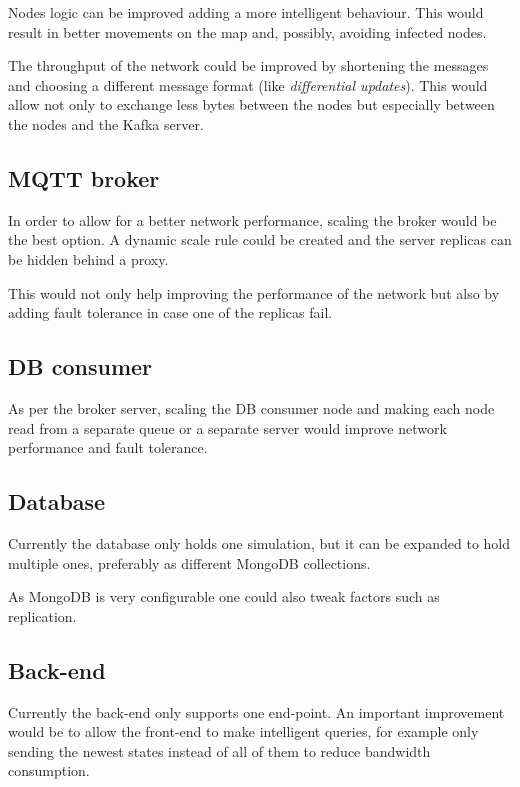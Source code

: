 \documentclass[conference]{IEEEtran}
\begin{document}
		Nodes logic can be improved adding a more intelligent behaviour.
		This would result in better movements on the map and, possibly, avoiding infected nodes.
		
		The throughput of the network could be improved by shortening the messages and choosing a different message format (like \textit{differential updates}).
		This would allow not only to exchange less bytes between the nodes but especially between the nodes and the Kafka server.
	
	\subsection{MQTT broker}
		
		In order to allow for a better network performance, scaling the broker would be the best option.
		A dynamic scale rule could be created and the server replicas can be hidden behind a proxy.
		
		This would not only help improving the performance of the network but also by adding fault tolerance in case one of the replicas fail.
		
	\subsection{DB consumer}
		
		As per the broker server, scaling the DB consumer node and making each node read from a separate queue or a separate server would improve network performance and fault tolerance.
	
	\subsection{Database}
	
		Currently the database only holds one simulation, but it can be expanded to hold multiple ones, preferably as different MongoDB collections.
		
		As MongoDB is very configurable one could also tweak factors such as replication.
	
	\subsection{Back-end}
		
		Currently the back-end only supports one end-point. An important improvement would be to allow the front-end to make intelligent queries, for example only sending the newest states instead of all of them to reduce bandwidth consumption. 
		
\end{document}
